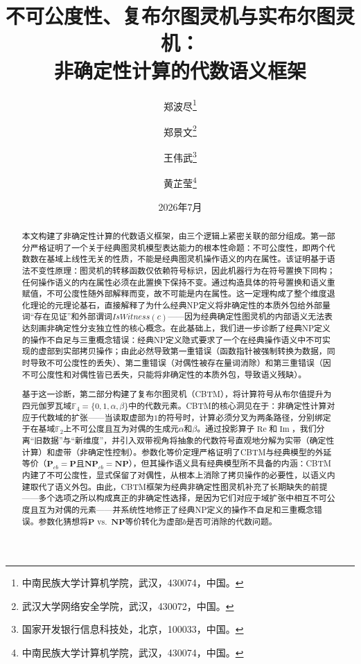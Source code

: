 \documentclass{ctexart}
\begin{document}
	
	\title{\bfseries 不可公度性、复布尔图灵机与实布尔图灵机：\\
		非确定性计算的代数语义框架}
	\author{郑波尽\thanks{中南民族大学计算机学院，武汉，430074，中国。}
		\and 郑景文\thanks{武汉大学网络安全学院，武汉，430072，中国。}
		\and 王伟武\thanks{国家开发银行信息科技处，北京，100033，中国。}
		\and 黄芷莹\thanks{中南民族大学计算机学院，武汉，430074，中国。}
	}
	\date{2026年7月}
	
	\maketitle
	
	\begin{abstract}
		本文构建了非确定性计算的代数语义框架，由三个逻辑上紧密关联的部分组成。第一部分严格证明了一个关于经典图灵机模型表达能力的根本性命题：不可公度性，即两个代数数在基域上线性无关的性质，不能是经典图灵机操作语义的内在属性。该证明基于语法不变性原理：图灵机的转移函数仅依赖符号标识，因此机器行为在符号置换下同构；任何操作语义的内在属性必须在此置换下保持不变。通过构造具体的符号置换和语义重赋值，不可公度性随外部解释而变，故不可能是内在属性。这一定理构成了整个维度退化理论的元理论基石，直接解释了为什么经典NP定义将非确定性的本质外包给外部量词``存在见证''和外部谓词$IsWitness(c)$——因为经典确定性图灵机的内部语义无法表达刻画非确定性分支独立性的核心概念。在此基础上，我们进一步诊断了经典NP定义的操作不自足与三重概念错误：经典NP定义隐式要求了一个在经典操作语义中不可实现的虚部到实部拷贝操作；由此必然导致第一重错误（函数指针被强制转换为数据，同时导致不可公度性的丢失）、第二重错误（对偶性被存在量词消除）和第三重错误（因不可公度性和对偶性皆已丢失，只能将非确定性的本质外包，导致语义残缺）。
		
		基于这一诊断，第二部分构建了复布尔图灵机（CBTM），将计算符号从布尔值提升为四元伽罗瓦域$\mathbb{F}_4 = \{0, 1, \alpha, \beta\}$中的代数元素。CBTM的核心洞见在于：非确定性计算对应于代数域的扩张——当读取虚部为$1$的符号时，计算必须分叉为两条路径，分别绑定于在基域$\mathbb{F}_2$上不可公度且互为对偶的生成元$\alpha$和$\beta$。通过投影算子$\operatorname{Re}$和$\operatorname{Im}$，我们分离``旧数据''与``新维度''，并引入双带视角将抽象的代数符号直观地分解为实带（确定性计算）和虚带（非确定性控制）。参数化等价定理严格证明了CBTM与经典模型的外延等价（$\mathbf{P}_{cb}=\mathbf{P}$且$\mathbf{NP}_{cb}=\mathbf{NP}$），但其操作语义具有经典模型所不具备的内涵：CBTM内建了不可公度性，显式保留了对偶性，从根本上消除了拷贝操作的必要性，以语义内建取代了语义外包。由此，CBTM框架为经典非确定性图灵机补充了长期缺失的前提——多个选项之所以构成真正的非确定性选择，是因为它们对应于域扩张中相互不可公度且互为对偶的元素——并系统性地修正了经典NP定义的操作不自足和三重概念错误。参数化猜想将$\mathbf{P}$ vs.\ $\mathbf{NP}$等价转化为虚部$b$是否可消除的代数问题。
		

\end{abstract}
\end{document}
